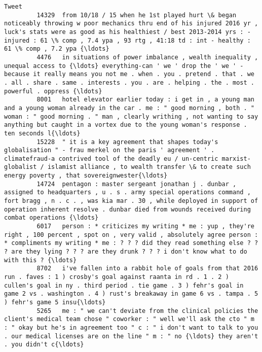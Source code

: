 \documentclass[11pt]{article}
\begin{document}
\begin{Verbatim}[commandchars=\\\{\}]
                                                                                                                                                                                                                                                                                                  Tweet  
         14329  from 10/18 / 15 when he 1st played hurt \& began noticeably throwing w poor mechanics thru end of his injured 2016 yr , luck's stats were as good as his healthiest / best 2013-2014 yrs : - injured : 61 \% comp , 7.4 ypa , 93 rtg , 41:18 td : int - healthy : 61 \% comp , 7.2 ypa {\ldots}  
         4476   in situations of power imbalance , wealth inequality , unequal access to {\ldots} everything-can ' we ' drop the ' we ' - because it really means you not me . when . you . pretend . that . we . all . share . same . interests . you . are . helping . the . most . powerful . oppress {\ldots}  
         8001   hotel elevator earlier today : i get in , a young man and a young woman already in the car . me : " good morning , both . " woman : " good morning . " man , clearly writhing , not wanting to say anything but caught in a vortex due to the young woman's response . ten seconds l{\ldots}  
         15228  " it is a key agreement that shapes today's globalisation " - frau merkel on the paris ' agreement ' . climatefraud-a contrived tool of the deadly eu / un-centric marxist-globalist / islamist alliance , to wealth transfer \& to create such energy poverty , that sovereignwester{\ldots}  
         14724  pentagon : master sergeant jonathan j . dunbar , assigned to headquarters , u . s . army special operations command , fort bragg , n . c . , was kia mar . 30 , while deployed in support of operation inherent resolve . dunbar died from wounds received during combat operations {\ldots}  
         6017   person : * criticizes my writing * me : yup , they're right , 100 percent , spot on , very valid , absolutely agree person : * compliments my writing * me : ? ? ? did they read something else ? ? ? are they lying ? ? ? are they drunk ? ? ? i don't know what to do with this ? {\ldots}  
         8702   i've fallen into a rabbit hole of goals from that 2016 run . faves : 1 ) crosby's goal against raanta in rd . 1 . 2 ) cullen's goal in ny . third period . tie game . 3 ) fehr's goal in game 2 vs . washington . 4 ) rust's breakaway in game 6 vs . tampa . 5 ) fehr's game 5 insu{\ldots}  
         5265   me : " we can't deviate from the clinical policies the client's medical team chose " coworker : " well we'll ask the cto " m : " okay but he's in agreement too " c : " i don't want to talk to you . our medical licenses are on the line " m : " no {\ldots} they aren't . you didn't c{\ldots}  

\end{Verbatim}
\end{document}
